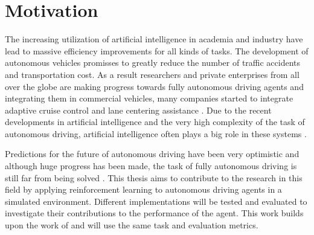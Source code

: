 \chapter{Motivation}
\label{cha:Motivation}

The increasing utilization of artificial intelligence in academia and industry have lead to massive efficiency improvements for all kinds of tasks. The development of autonomous vehicles promisses to greatly reduce the number of traffic accidents and transportation cost. As a result researchers and private enterprises from all over the globe are making progress towards fully autonomous driving agents and integrating them in commercial vehicles, many companies started to integrate adaptive cruise control and lane centering assistance \autocite{carreviews}. Due to the recent developments in artificial intelligence and the very high complexity of the task of autonomous driving, artificial intelligence often plays a big role in these systems \autocite{teslaEndToEnd}.

Predictions for the future of autonomous driving have been very optimistic and although huge progress has been made, the task of fully autonomous driving is still far from being solved \autocite{state_of_autonomous_driving2023}. This thesis aims to contribute to the research in this field by applying reinforcement learning to autonomous driving agents in a simulated environment. Different implementations will be tested and evaluated to investigate their contributions to the performance of the agent. This work builds upon the work of \autocite{maximilian} and will use the same task and evaluation metrics. %




